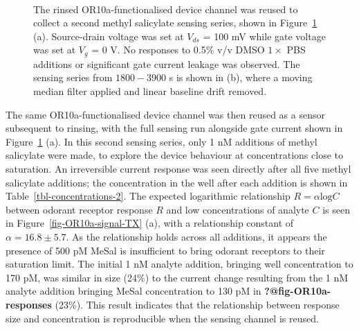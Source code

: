 \documentclass[
  a4paper,
]{scrbook}
\begin{document}
\begin{figure}
\begin{minipage}[t]{0.70\linewidth}
{{}

}

\end{minipage}%
%
\begin{minipage}[t]{0.15\linewidth}

{\centering 

~

}

\end{minipage}%

\caption{\label{fig-OR10a-responses-2}The rinsed OR10a-functionalised
device channel was reused to collect a second methyl salicylate sensing
series, shown in Figure~\ref{fig-OR10a-responses-2} (a). Source-drain
voltage was set at \(V_{ds}\) = 100 mV while gate voltage was set at
\(V_g\) = 0 V. No responses to 0.5\% v/v DMSO \(1 \times\) PBS additions
or significant gate current leakage was observed. The sensing series
from \(1800-3900\) s is shown in (b), where a moving median filter
applied and linear baseline drift removed.}

\end{figure}

The same OR10a-functionalised device channel was then reused as a sensor
subsequent to rinsing, with the full sensing run alongside gate current
shown in Figure~\ref{fig-OR10a-responses-2} (a). In this second sensing
series, only 1 nM additions of methyl salicylate were made, to explore
the device behaviour at concentrations close to saturation. An
irreversible current response was seen directly after all five methyl
salicylate additions; the concentration in the well after each addition
is shown in Table~\ref{tbl-concentrations-2}. The expected logarithmic
relationship \(R = \alpha\textrm{log}C\) between odorant receptor
response \(R\) and low concentrations of analyte \(C\) is seen in
Figure~\ref{fig-OR10a-signal-TX} (a), with a relationship constant of
\(\alpha =16.8\pm5.7\). As the relationship holds across all additions,
it appears the presence of 500 pM MeSal is insufficient to bring odorant
receptors to their saturation limit. The initial 1 nM analyte addition,
bringing well concentration to 170 pM, was similar in size (24\%) to the
current change resulting from the 1 nM analyte addition bringing MeSal
concentration to 130 pM in \textbf{?@fig-OR10a-responses} (23\%). This
result indicates that the relationship between response size and
concentration is reproducible when the sensing channel is reused.
\end{document}
